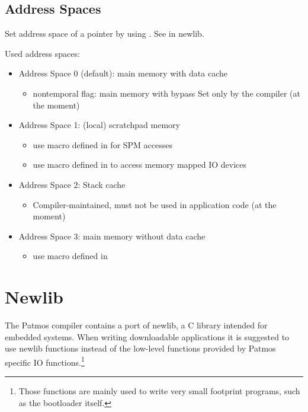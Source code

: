 \subsection{Address Spaces}

Set address space of a pointer by using . See  in newlib.

Used address spaces:
\begin{itemize}
\item Address Space 0 (default): main memory with data cache
  \begin{itemize}
  \item nontemporal flag: main memory with bypass
      Set only by the compiler (at the moment)
  \end{itemize}
\item Address Space 1: (local) scratchpad memory
  \begin{itemize}
  \item use macro  defined in  for SPM accesses
  \item use macro  defined in  to access memory mapped IO devices
  \end{itemize}
\item Address Space 2: Stack cache
  \begin{itemize}
  \item Compiler-maintained, must not be used in application code (at the moment)
  \end{itemize}
\item Address Space 3: main memory without data cache
  \begin{itemize}
  \item use macro  defined in 
  \end{itemize}
\end{itemize}

\section{Newlib}

The Patmos compiler contains a port of newlib, a C library intended for embedded systems. When  writing
downloadable applications it is suggested to use newlib functions instead of the low-level functions provided
by Patmos specific IO functions.\footnote{Those functions are mainly used to write very small footprint programs,
such as the bootloader itself.}

